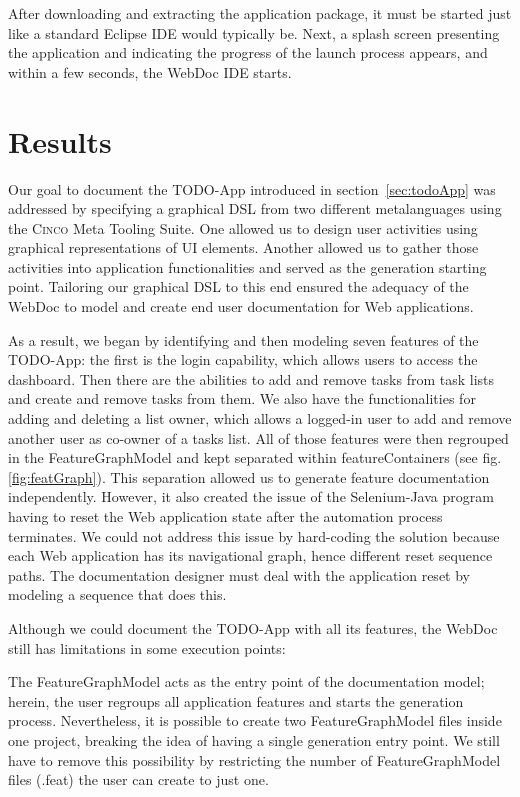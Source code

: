 After downloading and extracting the application package, it must be started just like a standard Eclipse IDE would typically be. Next, a splash screen presenting the application and indicating the progress of the launch process appears, and within a few seconds, the WebDoc IDE starts.

\section{Results}\label{sec:res}

Our goal to document the TODO-App introduced in section~\ref{sec:todoApp} was addressed by specifying a graphical DSL from two different metalanguages using the \textsc{Cinco} Meta Tooling Suite. One allowed us to design user activities using graphical representations of UI elements. Another allowed us to gather those activities into application functionalities and served as the generation starting point. Tailoring our graphical DSL to this end ensured the adequacy of the WebDoc to model and create end user documentation for Web applications.

As a result, we began by identifying and then modeling seven features of the TODO-App: the first is the login capability, which allows users to access the dashboard. Then there are the abilities to add and remove tasks from task lists and create and remove tasks from them. We also have the functionalities for adding and deleting a list owner, which allows a logged-in user to add and remove another user as co-owner of a tasks list. All of those features were then regrouped in the FeatureGraphModel and kept separated within featureContainers (see fig. \ref{fig:featGraph}). This separation allowed us to generate feature documentation independently. However, it also created the issue of the Selenium-Java program having to reset the Web application state after the automation process terminates. We could not address this issue by hard-coding the solution because each Web application has its navigational graph, hence different reset sequence paths. The documentation designer must deal with the application reset by modeling a sequence that does this.

Although we could document the TODO-App with all its features, the WebDoc still has limitations in some execution points:

The FeatureGraphModel acts as the entry point of the documentation model; herein, the user regroups all application features and starts the generation process. Nevertheless, it is possible to create two FeatureGraphModel files inside one project, breaking the idea of having a single generation entry point. We still have to remove this possibility by restricting the number of FeatureGraphModel files (.feat) the user can create to just one.

